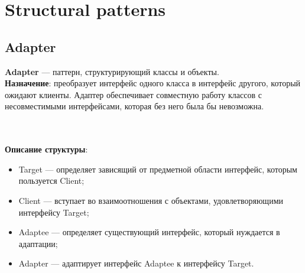 \documentclass[a3paper,11pt]{report}
\def \sboxSize {5cm}
\renewcommand{\unidirectionalAssociation}[4]{
	\draw [umlcd style, ->, umlcdNS] (#1) -- (#4)
	node[near end, above]{#2}
	node[near end, below]{#3};
}
\newcommand{\umlnoteND}[6]{
	\node[umlcd style, anchor=north, draw, shape=umlcdnote, text width=#2] at (#1) (note) {#3};
	\draw [umlcd style dashed line , ] (note.#4) ++(#5) --++(#6) coordinate(tmp) node[circle,inner sep=0pt,draw, fill=black!1, minimum size=5pt] (NoD) { };
}
\begin{document}
\section{Structural patterns}
\subsection{Adapter}

\large\textbf{Adapter} --- паттерн, структурирующий классы и объекты.
\\
\large\textbf{Назначение}: преобразует интерфейс одного класса в интерфейс другого, который ожидают клиенты. Адаптер обеспечивает совместную работу классов с несовместимыми интерфейсами, которая без него была бы невозможна.
\\

\\\\
\textbf{Описание структуры}:
\begin{itemize}
\item Target --- определяет зависящий от предметной области интерфейс, которым пользуется Client;
\item Client --- вступает во взаимоотношения с объектами, удовлетворяющими интерфейсу Target;
\item Adaptee --- определяет существующий интерфейс, который нуждается в адаптации;
\item Adapter --- адаптирует интерфейс Adaptee к интерфейсу Target.
\end{itemize}
\end{document}
